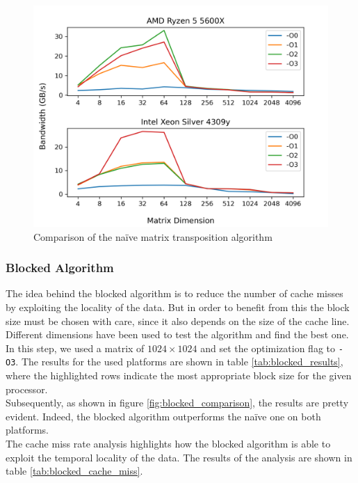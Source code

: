 \documentclass{article}
\begin{document}
\begin{figure}[H]
    \centering
    \includegraphics[scale=0.8]{report/img/naive_comparison.png}
    \caption{Comparison of the na\"{i}ve matrix transposition algorithm}
    \label{fig:naive_comparison}
\end{figure}
\subsubsection{Blocked Algorithm}
The idea behind the blocked algorithm is to reduce the number of cache misses by exploiting the locality of the data. But in order to benefit from this the block
size must be chosen with care, since it also depends on the size of the cache line. Different dimensions have been used to test the algorithm and find the best one.
In this step, we used a matrix of $1024 \times 1024$ and set the optimization flag to \texttt{-O3}.
The results for the used platforms are shown in table \ref{tab:blocked_results}, where the highlighted rows indicate the most appropriate 
block size for the given processor. \\
Subsequently, as shown in figure \ref{fig:blocked_comparison}, the results are pretty evident. Indeed, the blocked algorithm outperforms the na\"{i}ve one on both platforms. \\
The cache miss rate analysis highlights how the blocked algorithm is able to exploit the temporal locality of the data.
The results of the analysis are shown in table \ref{tab:blocked_cache_miss}. \\
\end{document}
